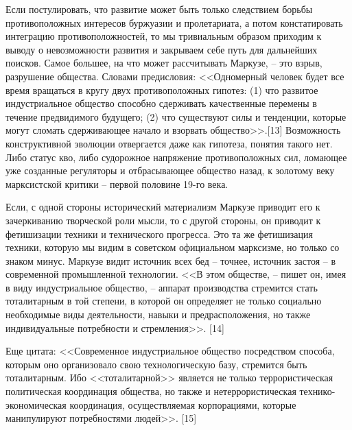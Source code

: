 \documentclass{book}
\begin{document}
Если постулировать, что развитие может быть только следствием борьбы противоположных интересов буржуазии и пролетариата, а потом констатировать интегра­цию противоположностей, то мы тривиальным образом при­ходим к выводу о невозможности развития и закрываем себе путь для дальнейших поисков. Самое большее, на что может рассчитывать Маркузе, -- это взрыв, разрушение общества. Словами предисловия: <<Одномерный человек  будет все время вращаться в кругу двух противоположных гипотез: (1) что развитое индустриальное общество способно сдерживать ка­чественные перемены в течение предвидимого будущего; (2) что существуют силы и тенденции, которые могут сломать сдерживающее начало и взорвать общество>>.[13] Возможность конструктивной эволюции отвергается даже как гипотеза, по­нятия такого нет. Либо статус кво, либо судорожное напряже­ние противоположных сил, ломающее уже созданные регуля­торы и отбрасывающее общество назад, к золотому веку марк­систской критики -- первой половине 19-го века.

Если, с одной стороны исторический материализм Маркузе приводит его к зачеркиванию творческой роли мысли, то с дру­гой стороны, он приводит к фетишизации техники и техниче­ского прогресса. Это та же фетишизация техники, которую мы видим в советском официальном марксизме, но только со знаком минус. Маркузе видит источник всех бед -- точнее, источник застоя -- в современной промышленной технологии. <<В этом обществе, -- пишет он, имея в виду индустриальное общество, -- аппарат производства стремится стать тоталитар­ным в той степени, в которой он определяет не только соци­ально необходимые виды деятельности, навыки и предрасполо­жения, но также индивидуальные потребности и стремления>>. [14]

Еще цитата: <<Современное индустриальное общество посред­ством способа, которым оно организовало свою технологиче­скую базу, стремится быть тоталитарным. Ибо <<тоталитарной>> является не только террористическая политическая коорди­нация общества, но также и нетеррористическая технико-эко­номическая координация, осуществляемая корпорациями, кото­рые манипулируют потребностями людей>>. [15]
\end{document}
